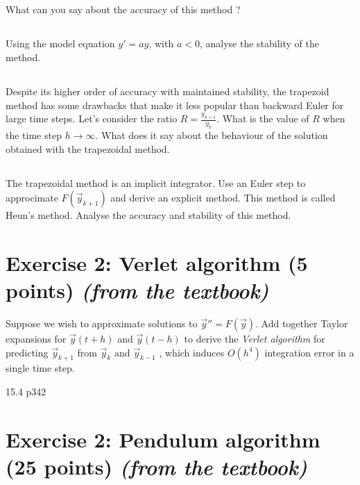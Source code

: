 \subsection{} What can you say about the accuracy of this method ?

\subsection{} Using the model equation $y' = ay$, with $a < 0$, analyse the stability of the method.

\subsection{} Despite its higher order of accuracy with maintained stability, the trapezoid method has some drawbacks that make it less popular than backward Euler for large time steps. Let's consider the ratio $R = \frac{y_{k+1}}{y_k}$. What is the value of $R$ when the time step $h \to \infty$. What does it say about the behaviour of the solution obtained with the trapezoidal method.

\subsection{} The trapezoidal method is an implicit integrator. Use an Euler step to approcimate $F(\vec{y}_{k+1})$ and derive an explicit method. This method is called Heun's method. Analyse the accuracy and stability of this method.

\section*{Exercise 2: Verlet algorithm \normalsize \textnormal(5 points) \textit{(from the textbook)}}

Suppose we wish to approximate solutions to $\vec{y}'' = F(\vec{y})$. Add together Taylor expansions for $\vec{y}(t + h)$ and $\vec{y}(t - h)$ to derive the \emph{Verlet algorithm} for predicting $\vec{y}_{k+1}$ from $\vec{y}_k$  and $\vec{y}_{k-1}$ , which induces $O(h^4)$ integration error in a single time step.

15.4 p342\\

\section*{Exercise 2: Pendulum algorithm \normalsize \textnormal(25 points) \textit{(from the textbook)}}

